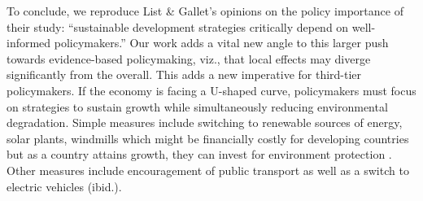 \documentclass[a4paper,12pt]{article}
\begin{document}
To conclude, we reproduce List \& Gallet’s \parencite*{list1999} opinions on the policy importance of their study: “sustainable development strategies critically depend on well-informed policymakers.” Our work adds a vital new angle to this larger push towards evidence-based policymaking, viz., that local effects may diverge significantly from the overall. This adds a new imperative for third-tier policymakers. If the economy is facing a U-shaped curve, policymakers must focus on strategies to sustain growth while simultaneously reducing environmental degradation. Simple measures include switching to renewable sources of energy, solar plants, windmills which might be financially costly for developing countries but as a country attains growth, they can invest for environment protection \parencite{unep2023}. Other measures include encouragement of public transport as well as a switch to electric vehicles (ibid.).


\printbibliography
\end{document}
